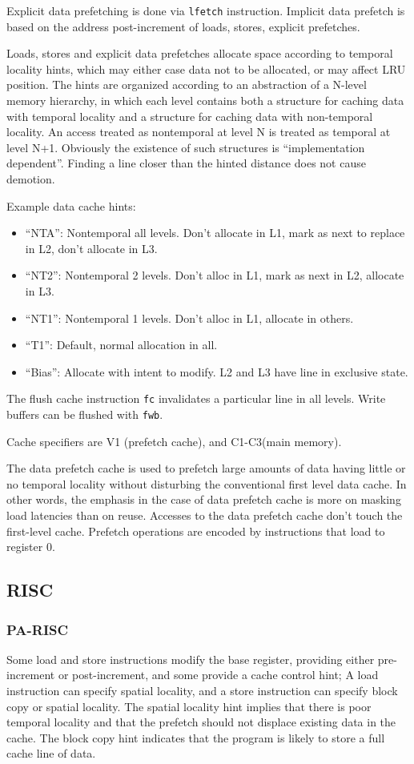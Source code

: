 Explicit data prefetching is done via \verb=lfetch= instruction. Implicit data prefetch is based on the address post-increment of loads, stores, explicit prefetches.

Loads, stores and explicit data prefetches allocate space according to temporal locality hints, which may either case data not to be allocated, or may affect LRU position. The hints are organized according to an abstraction of a N-level memory hierarchy, in which each level contains both a structure for caching data with temporal locality and a structure for caching data with non-temporal locality. An access treated as nontemporal at level N is treated as temporal at level N+1. Obviously the existence of such structures is ``implementation dependent''. Finding a line closer than the hinted distance does not cause demotion.

Example data cache hints:
\begin{itemize}
\item ``NTA'': Nontemporal all levels. Don't allocate in L1, mark as next to replace in L2, don't allocate in L3.
\item ``NT2'': Nontemporal 2 levels. Don't alloc in L1, mark as next in L2, allocate in L3.
\item ``NT1'': Nontemporal 1 levels. Don't alloc in L1, allocate in others.
\item ``T1'': Default, normal allocation in all.
\item ``Bias'': Allocate with intent to modify. L2 and L3 have line in exclusive state.
\end{itemize}

The flush cache instruction \verb=fc= invalidates a particular line in all levels. Write buffers can be flushed with \verb=fwb=.

Cache specifiers are V1 (prefetch cache), and C1-C3(main memory).

The data prefetch cache is used to prefetch large amounts of data having little or no temporal locality without disturbing the conventional first level data cache. In other words, the emphasis in the case of data prefetch cache is more on masking load latencies than on reuse. Accesses to the data prefetch cache don't touch the first-level cache. Prefetch operations are encoded by instructions that load to register 0.

\subsection{RISC}
\subsubsection{PA-RISC}
Some load and store instructions modify the base register, providing either pre-increment or post-increment, and some provide a cache control hint; A load instruction can specify spatial locality, and a store instruction can specify block copy or spatial locality. The spatial locality hint implies that there is poor temporal locality and that the prefetch should not displace existing data in the cache. The block copy hint indicates that the program is likely to store a full cache line of data.

